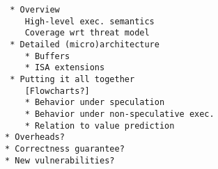 \begin{verbatim}
 * Overview
    High-level exec. semantics
    Coverage wrt threat model
 * Detailed (micro)architecture
    * Buffers
    * ISA extensions
 * Putting it all together
    [Flowcharts?]
    * Behavior under speculation
    * Behavior under non-speculative exec.
    * Relation to value prediction
* Overheads?
* Correctness guarantee?
* New vulnerabilities?
 \end{verbatim}